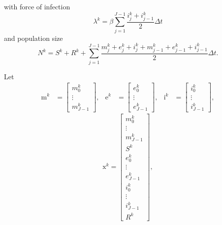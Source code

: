 \documentclass{jpmarticle}
\renewcommand{\vec}[1]{\boldsymbol{\mathrm{#1}}}
\begin{document}
with force of infection
\begin{equation}
  \lambda^k =
  \beta \sum_{j = 1}^{J - 1}
  \frac{i_j^k + i_{j - 1}^k}{2}
  \Delta t
\end{equation}
and population size
\begin{equation}
  N^k =
  S^k + R^k
  + \sum_{j = 1}^{J - 1}
  \frac{m_j^k + e_j^k + i_j^k + m_{j - 1}^k + e_{j - 1}^k + i_{j - 1}^k}{2}
  \Delta t.
\end{equation}

Let
\begin{align}
  \vec{m}^k &=
  \begin{bmatrix}
    m_0^k \\ \vdots \\ m_{J - 1}^k
  \end{bmatrix},
  &
  \vec{e}^k &=
  \begin{bmatrix}
    e_0^k \\ \vdots \\ e_{J - 1}^k
  \end{bmatrix},
  &
  \vec{i}^k &=
  \begin{bmatrix}
    i_0^k \\ \vdots \\ i_{J - 1}^k
  \end{bmatrix},
\end{align}
\begin{equation}
  \vec{x}^k =
  \begin{bmatrix}
    m_0^k \\ \vdots \\ m_{J - 1}^k \\
    S^k \\
    e_0^k \\ \vdots \\ e_{J - 1}^k \\
    i_0^k \\ \vdots \\ i_{J - 1}^k \\
    R^k
  \end{bmatrix},
\end{equation}
\end{document}

